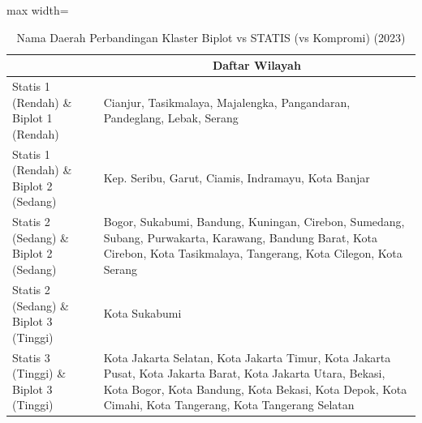 \begin{table}[H]
\centering
\caption{Nama Daerah Perbandingan Klaster Biplot vs STATIS (vs Kompromi) (2023)} \label{tab:app2biplot_statis_name_2023}
\begin{adjustbox}{max width=\textwidth}
\begin{tabular}{|>{\centering\arraybackslash}p{4cm}|p{10cm}|}
\hline
\multicolumn{1}{|c|}{\textbf{Kategori}} & \multicolumn{1}{c|}{\textbf{Daftar Wilayah}} \\
\hline
Statis 1 (Rendah) \& Biplot 1 (Rendah) & Cianjur, Tasikmalaya, Majalengka, Pangandaran, Pandeglang, Lebak, Serang \\
\hline
Statis 1 (Rendah) \& Biplot 2 (Sedang) & Kep. Seribu, Garut, Ciamis, Indramayu, Kota Banjar \\
\hline
Statis 2 (Sedang) \& Biplot 2 (Sedang) & Bogor, Sukabumi, Bandung, Kuningan, Cirebon, Sumedang, Subang, Purwakarta, Karawang, Bandung Barat, Kota Cirebon, Kota Tasikmalaya, Tangerang, Kota Cilegon, Kota Serang \\
\hline
Statis 2 (Sedang) \& Biplot 3 (Tinggi) & Kota Sukabumi \\
\hline
Statis 3 (Tinggi) \& Biplot 3 (Tinggi) & Kota Jakarta Selatan, Kota Jakarta Timur, Kota Jakarta Pusat, Kota Jakarta Barat, Kota Jakarta Utara, Bekasi, Kota Bogor, Kota Bandung, Kota Bekasi, Kota Depok, Kota Cimahi, Kota Tangerang, Kota Tangerang Selatan \\
\hline
\end{tabular}
\end{adjustbox}
\end{table}